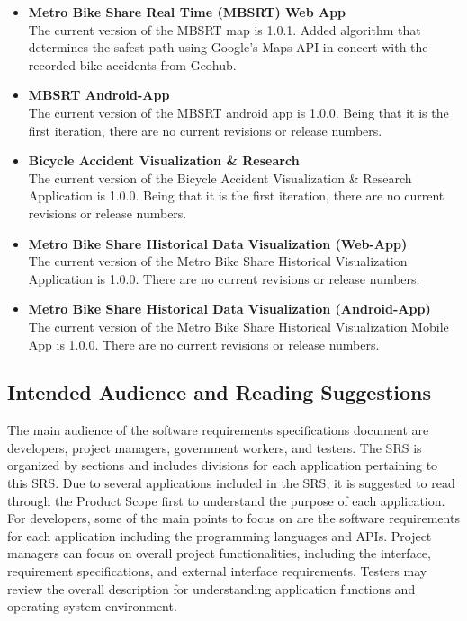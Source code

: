 \documentclass[15pt]{article}
\begin{document}
\begin{itemize}
    \item \textbf{Metro Bike Share Real Time (MBSRT) Web App} \\
    The current version of the MBSRT map is 1.0.1. Added algorithm that determines the safest path using Google’s Maps API in concert with the recorded bike accidents from Geohub.

    \item \textbf{MBSRT Android-App} \\
    The current version of the MBSRT android app is 1.0.0. Being that it is the first iteration, there are no current revisions or release numbers.

    \item \textbf{Bicycle Accident Visualization \& Research} \\
    The current version of the Bicycle Accident Visualization \& Research Application is 1.0.0. Being that it is the first iteration, there are no current revisions or release numbers.

    \item \textbf{Metro Bike Share Historical Data Visualization (Web-App)} \\
    The current version of the Metro Bike Share Historical Visualization Application is 1.0.0. There are no current revisions or release numbers.

    \item \textbf{Metro Bike Share Historical Data Visualization (Android-App)} \\
    The current version of the Metro Bike Share Historical Visualization Mobile App is 1.0.0. There are no current revisions or release numbers.
\end{itemize}


\subsection{Intended Audience and Reading Suggestions}
The main audience of the software requirements specifications document are developers, project managers, government workers, and testers. The SRS is organized by sections and includes divisions for each application pertaining to this SRS. Due to several applications included in the SRS, it is suggested to read through the Product Scope first to understand the purpose of each application. For developers, some of the main points to focus on are the software requirements for each application including the programming languages and APIs. Project managers can focus on overall project functionalities, including the interface, requirement specifications, and external interface requirements. Testers may review the overall description for understanding application functions and operating system environment.
\end{document}
